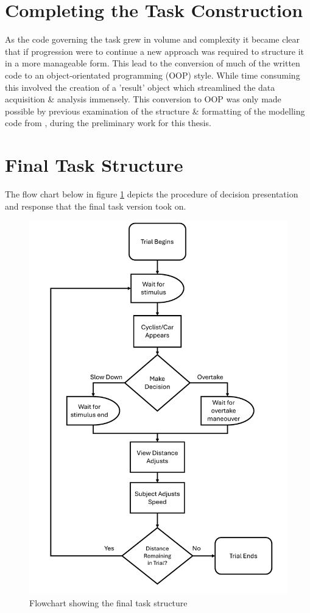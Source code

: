 \section{Completing the Task Construction}
As the code governing the task grew in volume and complexity it became clear that if progression were to continue a new approach was required to structure it in a more manageable form. This lead to the conversion of much of the written code to an object-orientated programming (OOP) style. While time consuming this involved the creation of a 'result' object which streamlined the data acquisition \& analysis immensely. This conversion to OOP was only made possible by previous examination of the structure \& formatting of the modelling code from \citet{geuzebroekBalancingTrueFalse2023}, during the preliminary work for this thesis.

\section{Final Task Structure}
The flow chart below in figure \ref{fig:Diagram_Flowchart} depicts the procedure of decision presentation and response that the final task version took on.
\begin{figure}[H]
    \centering
    \includegraphics[width=0.8\linewidth]{figures/Diagram_FlowChart}
    \caption{Flowchart showing the final task structure}
    \label{fig:Diagram_Flowchart}
\end{figure}

